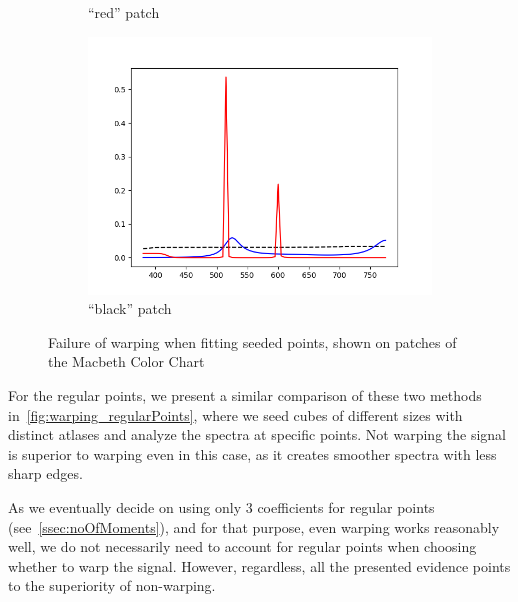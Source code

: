 \begin{figure}[t]
\begin{subfigure}[t]{0.32\textwidth}
		\caption{``red'' patch}
		\label{fig:warping_alp_red}
	\end{subfigure} \hspace{0.1em}
	\begin{subfigure}[t]{0.32\textwidth}
		\includegraphics[width=\linewidth]{img/results_warping_black.png}
		\caption{``black'' patch}
		\label{fig:warping_alp_black}
	\end{subfigure}
	\caption{Failure of warping when fitting seeded points, shown on patches of the Macbeth Color Chart}
	\label{fig:warping_atlasLatticePoints}
\end{figure}

For the regular points, we present a similar comparison of these two methods in~\cref{fig:warping_regularPoints}, where we seed cubes of different sizes with distinct atlases and analyze the spectra at specific points. Not warping the signal is superior to warping even in this case, as it creates smoother spectra with less sharp edges. 

As we eventually decide on using only 3 coefficients for regular points (see~\cref{ssec:noOfMoments}), and for that purpose, even warping works reasonably well, we do not necessarily need to account for regular points when choosing whether to warp the signal. However, regardless, all the presented evidence points to the superiority of non-warping.

